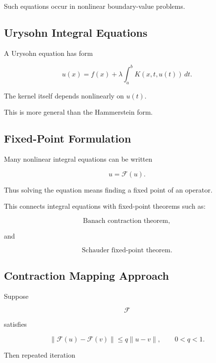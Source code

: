 Such equations occur in nonlinear boundary-value problems.

\subsection{Urysohn Integral Equations}
\label{subsec:urysohn-integral-equations}

A Urysohn equation has form

\[
\boxed{
u(x)
=
f(x)
+
\lambda
\int_a^b
K(x,t,u(t))
\,dt.
}
\]

The kernel itself depends nonlinearly on \(u(t)\).

This is more general than the Hammerstein form.

\subsection{Fixed-Point Formulation}
\label{subsec:integral-equation-fixed-point}

Many nonlinear integral equations can be written

\[
\boxed{
u=\mathcal{F}(u).
}
\]

Thus solving the equation means finding a fixed point of an operator.

This connects integral equations with fixed-point theorems such as:

\[
\boxed{
\text{Banach contraction theorem},
}
\]

and

\[
\boxed{
\text{Schauder fixed-point theorem}.
}
\]

\subsection{Contraction Mapping Approach}
\label{subsec:integral-contraction-mapping}

Suppose

\[
\mathcal{F}
\]

satisfies

\[
\boxed{
\|
\mathcal{F}(u)
-
\mathcal{F}(v)
\|
\leq
q
\|u-v\|,
\qquad
0<q<1.
}
\]

Then repeated iteration

